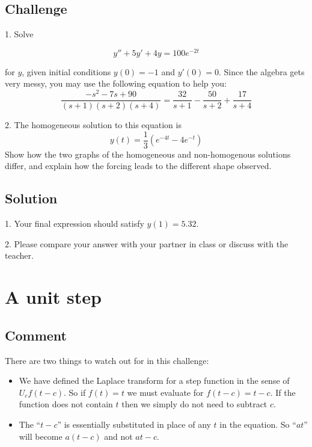 \subsection*{Challenge}
1. Solve

\begin{equation}
    y''+5y'+4y=100e^{-2t}
\end{equation}

for $y$, given initial conditions $y(0)=-1$ and $y'(0)=0$. Since the algebra gets very messy, you may use the following equation to help you:
\begin{equation}
    \frac{-s^2-7s+90}{(s+1)(s+2)(s+4)} = \frac{32}{s+1} - \frac{50}{s+2} + \frac{17}{s+4}
\end{equation}

2. The homogeneous solution to this equation is
\begin{equation}
    y(t)= \frac{1}{3} \left( e^{-4t} - 4 e^{-t} \right)
\end{equation}
Show how the two graphs of the homogeneous and non-homogenous solutions differ, and explain how the forcing leads to the different shape observed.

\subsection*{Solution}
1. Your final expression should satisfy $y(1)=5.32$.

2. Please compare your answer with your partner in class or discuss with the teacher.




\newpage
\section{A unit step}

\subsection*{Comment}
There are two things to watch out for in this challenge:
\begin{itemize}
    \item We have defined the Laplace transform for a step function in the sense of $U_c f(t-c)$. So if $f(t)=t$ we must evaluate for $f(t-c)=t-c$. If the function does not contain $t$ then we simply do not need to subtract $c$.
    \item The ``$t-c$'' is essentially substituted in place of any $t$ in the equation. So ``$at$'' will become $a(t-c)$ and not $at - c$.
\end{itemize}

